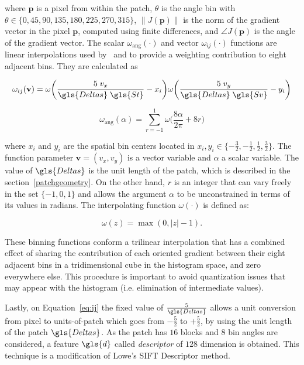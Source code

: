 \noindent  where $\mathbf{p}$ is a pixel from within the patch,  $\theta$ is the angle bin with $ \theta \in \{0, 45, 90, 135, 180, 225, 270, 315\} $,  $ \left\lVert J(\mathbf{p}) \right\rVert $ is the norm of the gradient vector in the pixel $\mathbf{p}$, computed using finite differences, and $\angle J(\mathbf{p}) $ is the angle of the gradient vector.  The scalar $ \omega_\mathrm{ang}(\cdot) $  and vector $ \omega_{ij}(\cdot) $ functions are linear interpolations used by~\cite{Lowe2004} and \cite{Vedaldi2010} to provide a weighting contribution to eight adjacent bins.  They are calculated as  

\begin{equation}
 \omega_{ij}(\mathbf{v}) = \omega \bigg ( \frac{5 \;v_x}{\gls{Deltas} \; \gls{St}} - x_i \bigg ) \omega \bigg ( \frac{5 \; v_y}{\gls{Deltas} \; \gls{Sv}} - y_i \bigg ) 
\label{eq:ij}
\end{equation}

\begin{equation}
 \omega_\mathrm{ang}(\alpha) = \sum_{r=-1}^{1} \omega \bigg ( \frac{8\alpha}{2\pi} + 8r \bigg )
\label{eq:wang}
\end{equation}

\noindent where $x_i$ and $y_i$ are the spatial bin centers located in $ x_i,y_i \in \{-\frac{3}{2},-\frac{1}{2},\frac{1}{2},\frac{3}{2}\} $. The function parameter $\mathbf{v} = ( v_x, v_y ) $ is a vector variable and $\alpha$ a scalar variable.  The value of  $\gls{Deltas}$ is the unit length of the patch, which is described in the section~\ref{patchgeometry}.  On the other hand, $r$ is an integer that can vary freely in the set $\{ -1, 0, 1 \} $ and allows the argument $\alpha$ to be unconstrained in terms of its values in radians. The interpolating function $\omega(\cdot)$ is defined as:

\begin{equation}
\omega(z) = \max(0,|z|-1).
\label{eq:weighting}
\end{equation}

These binning functions conform a trilinear interpolation that has a combined effect of sharing the contribution of each oriented gradient between their eight adjacent bins in a tridimensional cube in the histogram space, and zero everywhere else.  This procedure is important to avoid quantization issues that may appear with the histogram (i.e. elimination of intermediate values).

Lastly, on Equation~\ref{eq:ij} the fixed value of $ \frac{5}{\gls{Deltas}} $ allows a unit conversion from pixel to units-of-patch which goes from $-\frac{5}{2}$ to $+\frac{5}{2}$, by using the unit length of the patch $\gls{Deltas}$.  As the patch has  $16$ blocks and  $8$ bin angles are considered, a feature $\gls{d}$ called \textit{descriptor} of $128$ dimension is obtained. This technique is a modification of Lowe's SIFT Descriptor method.


